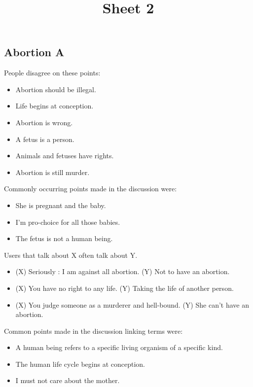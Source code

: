 \documentclass[tikz]{article}
\title{\textbf{Sheet 2}\vspace{-9ex}}
\date{}
\begin{document}
  \maketitle

  \begin{multicols}{2}
    \subsection*{Abortion A}
    People disagree on these points:
    \begin{itemize}[noitemsep,nolistsep,label={}]
      \item{Abortion should be illegal.}
      \item{Life begins at conception.}
      \item{Abortion is wrong.}
      \item{A fetus is a person.}
      \item{Animals and fetuses have rights.}
      \item{Abortion is still murder.}
    \end{itemize}

    Commonly occurring points made in the discussion were:
    \begin{itemize}[noitemsep,nolistsep,label={}]
          \item{She is pregnant and the baby.}
          \item{I'm pro-choice for all those babies.}
          \item{The fetus is not a human being.}
    \end{itemize}

    Users that talk about X often talk about Y.
    \begin{itemize}[noitemsep,nolistsep,label={}]
          \item{(X) Seriously : I am against all abortion. (Y) Not to have an abortion.}
          \item{(X) You have no right to any life. (Y) Taking the life of another person.}
          \item{(X) You judge someone as a murderer and hell-bound. (Y) She can't have an abortion.}
    \end{itemize}

    Common points made in the discussion linking terms were:
    \begin{itemize}[noitemsep,nolistsep,label={}]
          \item{A human being refers to a specific living organism of a specific kind.}
          \item{The human life cycle begins at conception.}
          \item{I must not care about the mother.}
    \end{itemize}


\end{multicols}
\end{document}
